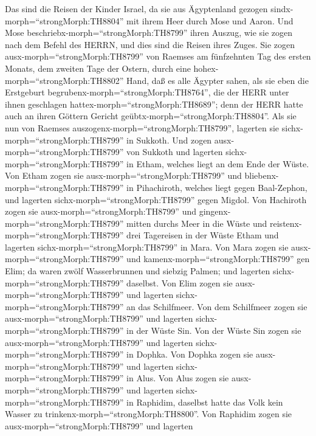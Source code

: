  Das sind die Reisen der Kinder Israel, da sie aus
Ägyptenland gezogen sindx-morph=``strongMorph:TH8804'' mit ihrem Heer
durch Mose und Aaron.  Und Mose
beschriebx-morph=``strongMorph:TH8799'' ihren Auszug, wie sie zogen nach
dem Befehl des HERRN, und dies sind die Reisen ihres Zuges. 
Sie zogen ausx-morph=``strongMorph:TH8799'' von Raemses am fünfzehnten
Tag des ersten Monats, dem zweiten Tage der Ostern, durch eine
hohex-morph=``strongMorph:TH8802'' Hand, daß es alle Ägypter sahen,
 als sie eben die Erstgeburt
begrubenx-morph=``strongMorph:TH8764'', die der HERR unter ihnen
geschlagen hattex-morph=``strongMorph:TH8689''; denn der HERR hatte auch
an ihren Göttern Gericht geübtx-morph=``strongMorph:TH8804''.
 Als sie nun von Raemses
auszogenx-morph=``strongMorph:TH8799'', lagerten sie
sichx-morph=``strongMorph:TH8799'' in Sukkoth.  Und zogen
ausx-morph=``strongMorph:TH8799'' von Sukkoth und lagerten
sichx-morph=``strongMorph:TH8799'' in Etham, welches liegt an dem Ende
der Wüste.  Von Etham zogen sie
ausx-morph=``strongMorph:TH8799'' und
bliebenx-morph=``strongMorph:TH8799'' in Pihachiroth, welches liegt
gegen Baal-Zephon, und lagerten sichx-morph=``strongMorph:TH8799'' gegen
Migdol.  Von Hachiroth zogen sie
ausx-morph=``strongMorph:TH8799'' und
gingenx-morph=``strongMorph:TH8799'' mitten durchs Meer in die Wüste und
reistenx-morph=``strongMorph:TH8799'' drei Tagereisen in der Wüste Etham
und lagerten sichx-morph=``strongMorph:TH8799'' in Mara. 
Von Mara zogen sie ausx-morph=``strongMorph:TH8799'' und
kamenx-morph=``strongMorph:TH8799'' gen Elim; da waren zwölf
Wasserbrunnen und siebzig Palmen; und lagerten
sichx-morph=``strongMorph:TH8799'' daselbst.  Von Elim
zogen sie ausx-morph=``strongMorph:TH8799'' und lagerten
sichx-morph=``strongMorph:TH8799'' an das Schilfmeer.  Von
dem Schilfmeer zogen sie ausx-morph=``strongMorph:TH8799'' und lagerten
sichx-morph=``strongMorph:TH8799'' in der Wüste Sin.  Von
der Wüste Sin zogen sie ausx-morph=``strongMorph:TH8799'' und lagerten
sichx-morph=``strongMorph:TH8799'' in Dophka.  Von Dophka
zogen sie ausx-morph=``strongMorph:TH8799'' und lagerten
sichx-morph=``strongMorph:TH8799'' in Alus.  Von Alus zogen
sie ausx-morph=``strongMorph:TH8799'' und lagerten
sichx-morph=``strongMorph:TH8799'' in Raphidim, daselbst hatte das Volk
kein Wasser zu trinkenx-morph=``strongMorph:TH8800''.  Von
Raphidim zogen sie ausx-morph=``strongMorph:TH8799'' und lagerten
